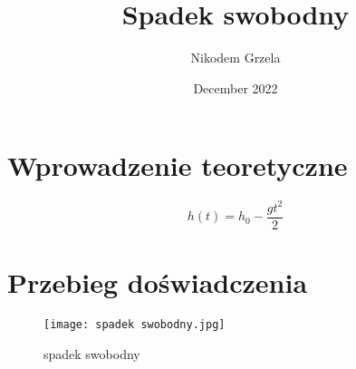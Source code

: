 \documentclass{article}
\title{Spadek swobodny}
\author{Nikodem Grzela}
\date{December 2022}
\begin{document}
\maketitle

\section{Wprowadzenie teoretyczne}
\begin{equation}
    h(t)=h_0-\frac{gt^2}{2}
\end{equation}
\section{Przebieg doświadczenia}
\begin{figure}[h]
    \caption{spadek swobodny}
    \centering
    \texttt{[image: spadek swobodny.jpg]}
    \label{fig:spadek1}
\end{figure}
\end{document}
